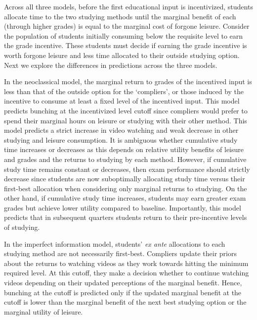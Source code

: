 \documentclass[12pt]{article}
\begin{document}
Across all three models, before the first educational input is incentivized, students allocate time to the two studying methods until the marginal benefit of each (through higher grades) is equal to the marginal cost of forgone leisure. Consider the population of students initially consuming below the requisite level to earn the grade incentive. These students must decide if earning the grade incentive is worth forgone leisure and less time allocated to their outside studying option. Next we explore the differences in predictions across the three models.




In the neoclassical model, the marginal return to grades of the incentived input is less than that of the outside option for the `compliers', or those induced by the incentive to consume at least a fixed level of the incentived input. This model predicts bunching at the incentivized level cutoff since compliers would prefer to spend their marginal hours on leisure or studying with their other method. This model predicts a strict increase in video watching and weak decrease in other studying and leisure consumption. It is ambiguous whether cumulative study time increases or decreases as this depends on relative utility benefits of leisure and grades and the returns to studying by each method. However, if cumulative study time remains constant or decreases, then exam performance should strictly decrease since students are now suboptimally allocating study time versus their first-best allocation when considering only marginal returns to studying. On the other hand, if cumulative study time increases, students may earn greater exam grades but achieve lower utility compared to baseline. Importantly, this model predicts that in subsequent quarters students return to their pre-incentive levels of studying.

In the imperfect information model, students' \textit{ex ante} allocations to each studying method are not necessarily first-best. Compliers update their priors about the returns to watching videos as they work towards hitting the minimum required level. At this cutoff, they make a decision whether to continue watching videos depending on their updated perceptions of the marginal benefit. Hence, bunching at the cutoff is predicted only if the updated marginal benefit at the cutoff is lower than the marginal benefit of the next best studying option or the marginal utility of leisure.
\end{document}
